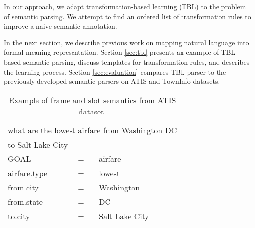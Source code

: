 \documentclass{article}
\begin{document}

In our approach, we adapt transformation-based learning (TBL) \cite{brill95} to the problem of semantic parsing. We attempt to find an ordered list of transformation rules to improve a naive semantic annotation. 


In the next section, we describe previous work on mapping natural language into formal meaning representation. Section \ref{sec:tbl} presents an example of TBL based semantic parsing, discuss templates for transformation rules, and describes the learning process. Section \ref{sec:evaluation} compares TBL parser to the previously developed semantic parsers on ATIS \cite{atis94} and TownInfo \cite{mairesse09} datasets.

\begin{table}
\begin{center}
\begin{tabular}{lll} 
  \multicolumn{3}{l}{what are the lowest airfare from Washington DC} \\
  \multicolumn{3}{l}{to Salt Lake City} \\
  \hline
  GOAL          & = & airfare \\
  airfare.type  & = & lowest \\
  from.city     & = & Washington \\
  from.state    & = & DC \\
  to.city       & = & Salt Lake City \\
\end{tabular} 
\end{center}
\caption{Example of frame and slot semantics from ATIS \cite{atis94} dataset.}
\label{tbl:sem:example}
\end{table}
\end{document}
